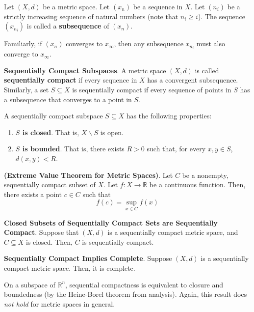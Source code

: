 \begin{defn}
     Let $(X,d)$ be a metric space. Let $(x_n)$ be a sequence in $X$. Let $(n_i)$ be a strictly increasing sequence of natural numbers (note that $n_i\geq i$). The sequence $(x_{n_i})$ is called a \textbf{subsequence} of $(x_n)$.
\end{defn}
Familiarly, if $(x_n)$ converges to $x_\infty$, then any subsequence $x_{n_i}$ must also converge to $x_\infty$.

\begin{shaded}
    \textbf{Sequentially Compact Subspaces}. A metric space $(X,d)$ is called \textbf{sequentially compact} if every sequence in $X$ has a convergent subsequence. Similarly, a set $S\subseteq X$ is sequentially compact if every sequence of points in $S$ has a subsequence that converges to a point in $S$.

    A sequentially compact subspace $S\subseteq X$ has the following properties: \vspace{-1em}\begin{enumerate}
        \item \textbf{$S$ is closed}. That is, $X\backslash S$ is open.
        \item \textbf{$S$ is bounded}. That is, there exists $R>0$ such that, for every $x,y\in S$, $d(x,y)<R$.
    \end{enumerate}

    \begin{theorem*}
        \textbf{(Extreme Value Theorem for Metric Spaces)}. Let $C$ be a nonempty, sequentially compact subset of $X$. Let $f:X\to\mathbb{R}$ be a continuous function. Then, there exists a point $c\in C$ such that \[f(c)=\displaystyle\sup_{x\in C}f(x)\]
    \end{theorem*}

    \begin{theorem*}
        \textbf{Closed Subsets of Sequentially Compact Sets are Sequentially Compact}. Suppose that $(X,d)$ is a sequentially compact metric space, and $C\subseteq X$ is closed. Then, $C$ is sequentially compact.
    \end{theorem*}

    \begin{theorem*}
        \textbf{Sequentially Compact Implies Complete}. Suppose $(X,d)$ is a sequentially compact metric space. Then, it is complete.
    \end{theorem*}
\end{shaded}

On a subspace of $\mathbb{R}^n$, sequential compactness is equivalent to closure and boundedness (by the Heine-Borel theorem from analysis). Again, this result does \textit{not hold} for metric spaces in general.

